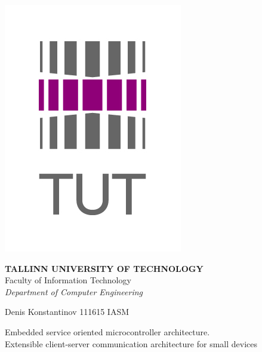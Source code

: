 \begin{titlepage}
	\begin{center}	
		\begin{minipage}[h]{0.01\linewidth}
			\begin{flushleft}	
				\includegraphics[scale=0.2]{../images/template/ttu_logo_2.jpg}
			\end{flushleft}		
		\end{minipage}
		\begin{minipage}[h]{0.98\linewidth}
			\begin{center}
				
				\textbf{TALLINN UNIVERSITY OF TECHNOLOGY}\\			
				Faculty of Information Technology \\			
				\textit{Department of Computer Engineering} \\			
		
			\end{center}
		\end{minipage}
	\end{center}
	\vspace{3cm}
	
	\begin{center}
		Denis Konstantinov \footnotesize \textsf{111615 IASM}
	\end{center}
	
	\vspace{5em}
	
	\begin{center} 
		\Large {Embedded service oriented microcontroller architecture.}\\
		\vspace{1em}
		\small {Extensible client-server communication architecture for small
		devices}\\
	\end{center}
	

\end{titlepage}

